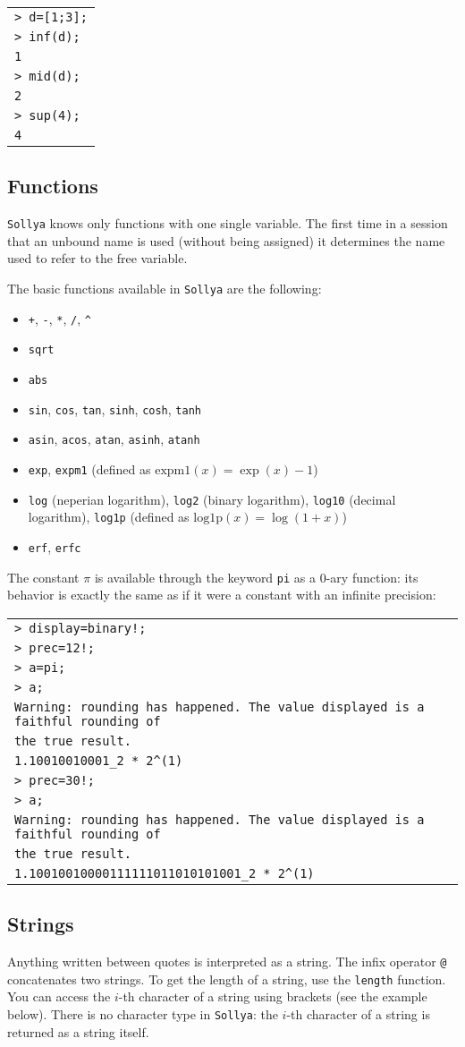 \documentclass[a4paper]{article}
\newcommand{\com}[1]{\texttt{#1}}
\newcommand{\key}[1]{\texttt{#1}}
\newcommand{\sollya}{\texttt{Sollya}\xspace}
\newcommand{\code}[1]{
\begin{center}
\begin{tabular}{|p{14.8cm}|}
\hline
#1
\hline
\end{tabular}
\end{center}
}
\newcommand{\ligne}[1]{\texttt{#1}\\}
\begin{document}
\code{
\ligne{> d=[1;3];}
\ligne{> inf(d);}
\ligne{1}
\ligne{> mid(d);}
\ligne{2}
\ligne{> sup(4);}
\ligne{4}
}

\subsection{Functions}
\sollya knows only functions with one single variable. The first time in a session that an unbound name is used (without being assigned) it determines the name used to refer to the free variable.

The basic functions available in \sollya are the following:
\begin{itemize}
\item \com{+}, \com{-}, \com{*}, \com{/}, \com{\^{}}
\item \com{sqrt}
\item \com{abs}
\item \com{sin}, \com{cos}, \com{tan}, \com{sinh}, \com{cosh}, \com{tanh}
\item \com{asin}, \com{acos}, \com{atan}, \com{asinh}, \com{atanh}
\item \com{exp}, \com{expm1} (defined as $\mathrm{expm1}(x) = \exp(x)-1$)
\item \com{log} (neperian logarithm), \com{log2} (binary logarithm), \com{log10} (decimal logarithm), \com{log1p} (defined as $\mathrm{log1p}(x) = \log(1+x)$)
\item \com{erf}, \com{erfc}
\end{itemize}

The constant $\pi$ is available through the keyword \key{pi} as a $0$-ary function: its behavior is exactly the same as if it were a constant with an infinite precision:

\code{
\ligne{> display=binary!;}
\ligne{> prec=12!;}
\ligne{> a=pi;}
\ligne{> a;}
\ligne{Warning: rounding has happened. The value displayed is a faithful rounding of}
\ligne{the true result.}
\ligne{1.10010010001\_2 * 2\^{}(1)}
\ligne{> prec=30!;}
\ligne{> a;}
\ligne{Warning: rounding has happened. The value displayed is a faithful rounding of}
\ligne{the true result.}
\ligne{1.10010010000111111011010101001\_2 * 2\^{}(1)}
}


\subsection{Strings}
Anything written between quotes is interpreted as a string. The infix operator \com{@} concatenates two strings. To get the length of a string, use the \com{length} function. You can access the $i$-th character of a string using brackets (see the example below). There is no character type in \sollya: the $i$-th character of a string is returned as a string itself.
\end{document}
